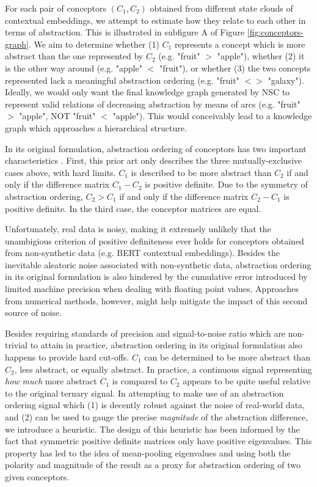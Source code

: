 For each pair of conceptors $(C_1, C_2)$ obtained from different state clouds of contextual embeddings, we attempt to estimate how they relate to each other in terms of abstraction. This is illustrated in subfigure A of Figure \ref{fig:conceptors-graph}. We aim to determine whether (1) $C_1$ represents a concept which is more abstract than the one represented by $C_2$ (e.g. "fruit" $>$ "apple"), whether (2) it is the other way around (e.g. "apple" $<$ "fruit"), or whether (3) the two concepts represented lack a meaningful abstraction ordering (e.g. "fruit" $<>$ "galaxy"). Ideally, we would only want the final knowledge graph generated by NSC to represent valid relations of decreasing abstraction by means of arcs (e.g. "fruit" $>$ "apple", NOT "fruit" $<$ "apple"). This would conceivably lead to a knowledge graph which approaches a hierarchical structure.

In its original formulation, abstraction ordering of conceptors has two important characteristics \citep{jaeger_controlling_2017}. First, this prior art only describes the three mutually-exclusive cases above, with hard limits. $C_1$ is described to be more abstract than $C_2$ if and only if the difference matrix $C_1 - C_2$ is positive definite. Due to the symmetry of abstraction ordering, $C_2 > C_1$ if and only if the difference matrix $C_2 - C_1$ is positive definite. In the third case, the conceptor matrices are equal.

Unfortunately, real data is noisy, making it extremely unlikely that the unambigious criterion of positive definiteness ever holds for conceptors obtained from non-synthetic data (e.g. BERT contextual embeddings). Besides the inevitable aleatoric noise associated with non-synthetic data, abstraction ordering in its original formulation is also hindered by the cumulative error introduced by limited machine precision when dealing with floating point values. Approaches from numerical methods, however, might help mitigate the impact of this second source of noise.

Besides requiring standards of precision and signal-to-noise ratio which are non-trivial to attain in practice, abstraction ordering in its original formulation also happens to provide hard cut-offs. $C_1$ can be determined to be more abstract than $C_2$, less abstract, or equally abstract. In practice, a continuous signal representing \textit{how much} more abstract $C_1$ is compared to $C_2$ appears to be quite useful relative to the original ternary signal. In attempting to make use of an abstraction ordering signal which (1) is decently robust against the noise of real-world data, and (2) can be used to gauge the precise \textit{magnitude} of the abstraction difference, we introduce a heuristic. The design of this heuristic has been informed by the fact that symmetric positive definite matrices only have positive eigenvalues. This property has led to the idea of mean-pooling eigenvalues and using both the polarity and magnitude of the result as a proxy for abstraction ordering of two given conceptors.


